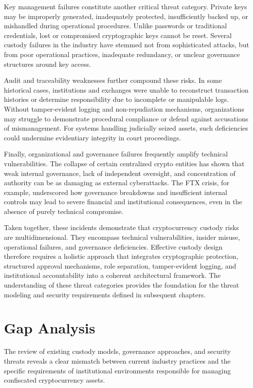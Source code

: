 \documentclass[12pt,a4paper]{report}
\begin{document}
Key management failures constitute another critical threat category. Private keys may be improperly generated, inadequately protected, insufficiently backed up, or mishandled during operational procedures. Unlike passwords or traditional credentials, lost or compromised cryptographic keys cannot be reset. Several custody failures in the industry have stemmed not from sophisticated attacks, but from poor operational practices, inadequate redundancy, or unclear governance structures around key access.

Audit and traceability weaknesses further compound these risks. In some historical cases, institutions and exchanges were unable to reconstruct transaction histories or determine responsibility due to incomplete or manipulable logs. Without tamper-evident logging and non-repudiation mechanisms, organizations may struggle to demonstrate procedural compliance or defend against accusations of mismanagement. For systems handling judicially seized assets, such deficiencies could undermine evidentiary integrity in court proceedings.

Finally, organizational and governance failures frequently amplify technical vulnerabilities. The collapse of certain centralized crypto entities has shown that weak internal governance, lack of independent oversight, and concentration of authority can be as damaging as external cyberattacks. The FTX crisis, for example, underscored how governance breakdowns and insufficient internal controls may lead to severe financial and institutional consequences, even in the absence of purely technical compromise.

Taken together, these incidents demonstrate that cryptocurrency custody risks are multidimensional. They encompass technical vulnerabilities, insider misuse, operational failures, and governance deficiencies. Effective custody design therefore requires a holistic approach that integrates cryptographic protection, structured approval mechanisms, role separation, tamper-evident logging, and institutional accountability into a coherent architectural framework. The understanding of these threat categories provides the foundation for the threat modeling and security requirements defined in subsequent chapters.

\section{Gap Analysis}

The review of existing custody models, governance approaches, and security threats reveals a clear mismatch between current industry practices and the specific requirements of institutional environments responsible for managing confiscated cryptocurrency assets.
\end{document}
